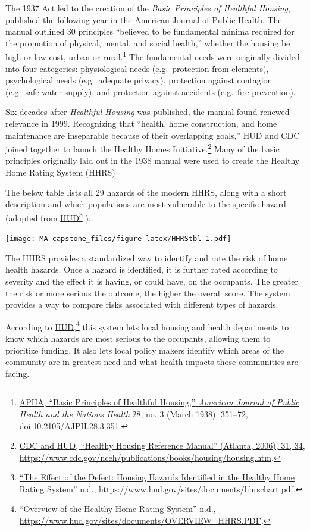 \documentclass[
  openany]{book}
\begin{document}
The 1937 Act led to the creation of the \emph{Basic Principles of Healthful Housing}, published the following year in the American Journal of Public Health. The manual outlined 30 principles ``believed to be fundamental minima required for the promotion of physical, mental, and social health,'' whether the housing be high or low cost, urban or rural.\footnote{\protect\hyperlink{ref-apha1938}{APHA, {``Basic Principles of Healthful Housing,''} \emph{American Journal of Public Health and the Nations Health} 28, no. 3 (March 1938): 351--72, doi:\href{https://doi.org/10.2105/AJPH.28.3.351}{10.2105/AJPH.28.3.351}}.} The fundamental needs were originally divided into four categories: physiological needs (e.g.~protection from elements), psychological needs (e.g.~adequate privacy), protection against contagion (e.g.~safe water supply), and protection against accidents (e.g.~fire prevention).

Six decades after \emph{Healthful Housing} was published, the manual found renewed relevance in 1999. Recognizing that ``health, home construction, and home maintenance are inseparable because of their overlapping goals,'' HUD and CDC joined together to launch the Healthy Homes Initiative.\footnote{\protect\hyperlink{ref-cdc2006}{CDC and HUD, {``Healthy Housing Reference Manual''} (Atlanta, 2006), 31, 34, \url{https://www.cdc.gov/nceh/publications/books/housing/housing.htm}}.} Many of the basic principles originally laid out in the 1938 manual were used to create the Healthy Home Rating System (HHRS)

The below table lists all 29 hazards of the modern HHRS, along with a short description and which populations are most vulnerable to the specific hazard (adopted from \protect\hyperlink{ref-HHRSlst}{HUD}\footnote{\protect\hyperlink{ref-HHRSlst}{{``The Effect of the Defect: Housing Hazards Identified in the Healthy Home Rating System''} n.d., \url{https://www.hud.gov/sites/documents/hhrschart.pdf}}.} ).

\texttt{[image: MA-capstone\_files/figure-latex/HHRStbl-1.pdf]}

The HHRS provides a standardized way to identify and rate the risk of home health hazards. Once a hazard is identified, it is further rated according to severity and the effect it is having, or could have, on the occupants. The greater the risk or more serious the outcome, the higher the overall score. The system provides a way to compare risks associated with different types of hazards.

According to \protect\hyperlink{ref-HHRSover}{HUD},\footnote{\protect\hyperlink{ref-HHRSover}{{``Overview of the Healthy Home Rating System''} n.d., \url{https://www.hud.gov/sites/documents/OVERVIEW_HHRS.PDF}}.} this system lets local housing and health departments to know which hazards are most serious to the occupants, allowing them to prioritize funding. It also lets local policy makers identify which areas of the community are in greatest need and what health impacts those communities are facing.
\end{document}
